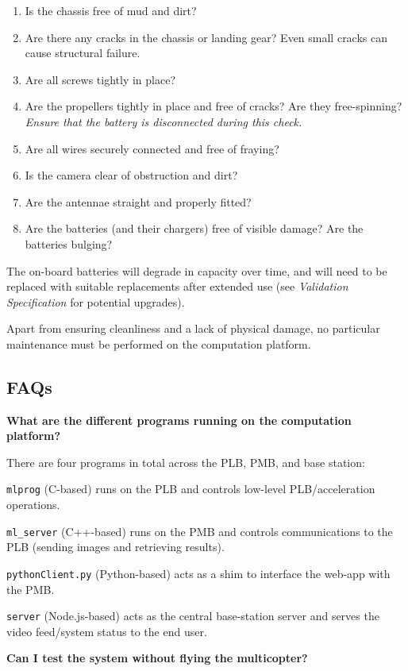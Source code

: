 \documentclass[10pt,letterpaper]{article}
\begin{document}
\begin{enumerate}
\item Is the chassis free of mud and dirt?
\item Are there any cracks in the chassis or landing gear? Even small cracks can cause structural failure.
\item Are all screws tightly in place?
\item Are the propellers tightly in place and free of cracks? Are they free-spinning? \textit{Ensure that the battery is disconnected during this check.}
\item Are all wires securely connected and free of fraying?
\item Is the camera clear of obstruction and dirt?
\item Are the antennae straight and properly fitted?
\item Are the batteries (and their chargers) free of visible damage? Are the batteries bulging?
\end{enumerate}

The on-board batteries will degrade in capacity over time, and will need to be replaced with suitable replacements after extended use (see \textit{Validation Specification} for potential upgrades).

Apart from ensuring cleanliness and a lack of physical damage, no particular maintenance must be performed on the computation platform.

\subsection{FAQs}
\textbf{What are the different programs running on the computation platform?}

There are four programs in total across the PLB, PMB, and base station:

\texttt{mlprog} (C-based) runs on the PLB and controls low-level PLB/acceleration operations.

\texttt{ml\_server} (C++-based) runs on the PMB and controls communications to the PLB (sending images and retrieving results).

\texttt{pythonClient.py} (Python-based) acts as a shim to interface the web-app with the PMB.

\texttt{server} (Node.js-based) acts as the central base-station server and serves the video feed/system status to the end user.

\textbf{Can I test the system without flying the multicopter?}
\end{document}
